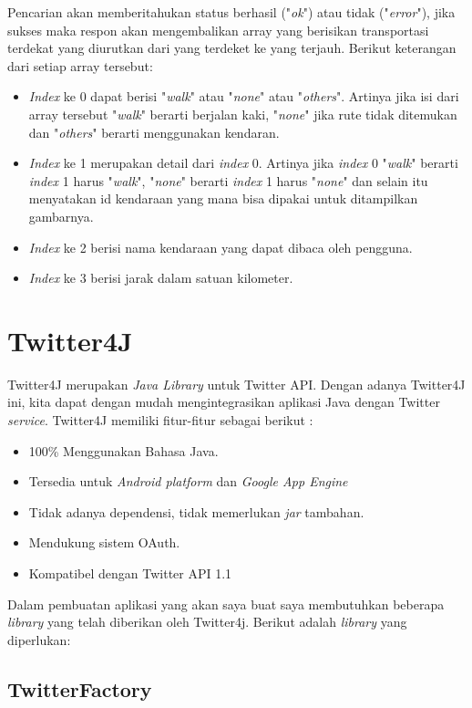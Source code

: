 Pencarian akan memberitahukan status berhasil ("\textit{ok}") atau tidak ("\textit{error}"), jika sukses maka respon akan mengembalikan array yang berisikan transportasi terdekat yang diurutkan dari yang terdeket ke yang terjauh. Berikut keterangan dari setiap array tersebut: 
\begin{itemize}
	\item \textit{Index} ke 0 dapat berisi "\textit{walk}" atau "\textit{none}" atau "\textit{others}". Artinya  jika isi dari array tersebut "\textit{walk}" berarti berjalan kaki, "\textit{none}" jika rute tidak ditemukan dan "\textit{others}" berarti menggunakan kendaran.
	\item \textit{Index} ke 1 merupakan detail dari \textit{index} 0. Artinya jika \textit{index} 0 "\textit{walk}" berarti \textit{index} 1 harus "\textit{walk}", "\textit{none}" berarti \textit{index} 1 harus "\textit{none}" dan selain itu menyatakan id kendaraan yang mana bisa dipakai untuk ditampilkan gambarnya.
	\item \textit{Index} ke 2 berisi nama kendaraan yang dapat dibaca oleh pengguna.
	\item \textit{Index} ke 3 berisi jarak dalam satuan kilometer.
\end{itemize}

\section{Twitter4J}
Twitter4J merupakan \textit{Java Library} untuk Twitter API. Dengan adanya Twitter4J ini, kita dapat dengan mudah mengintegrasikan aplikasi Java dengan Twitter \textit{service}. Twitter4J memiliki fitur-fitur sebagai berikut :

\begin{itemize}
	\item 100\% Menggunakan Bahasa Java.
	\item Tersedia untuk \textit{Android platform} dan \textit{Google App Engine}
	\item Tidak adanya dependensi, tidak memerlukan \textit{jar} tambahan.
	\item Mendukung sistem OAuth.
	\item Kompatibel dengan Twitter API 1.1
\end{itemize}

Dalam pembuatan aplikasi yang akan saya buat saya membutuhkan beberapa \textit{library} yang telah diberikan oleh Twitter4j. Berikut adalah \textit{library} yang diperlukan:
\subsection{TwitterFactory}
	

